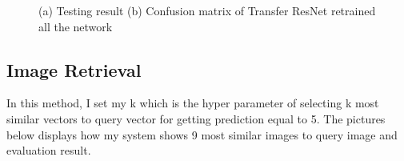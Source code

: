 \documentclass[runningheads]{llncs}
\begin{document}
\begin{figure}[H]
    \centering
    \caption{(a) Testing result (b) Confusion matrix of Transfer ResNet retrained all the network}
    \label{fig:rn2_test}
\end{figure}
\subsection{\large\bf Image Retrieval}
In this method, I set my k which is the hyper parameter of selecting k most similar vectors to query vector for getting prediction equal to 5. The pictures below displays how my system shows 9 most similar images to query image and evaluation result.
\end{document}

